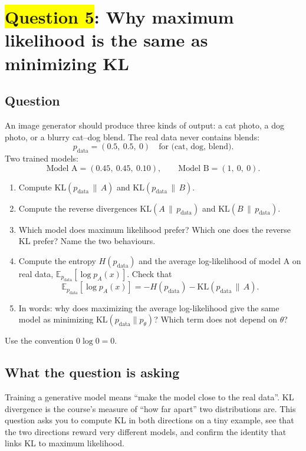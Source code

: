 \documentclass[12pt,a4paper]{article}
\begin{document}
\section{\texorpdfstring{\colorbox{yellow}{Question 5}}{Question 5}: Why maximum likelihood is the same as minimizing KL}

\subsection{Question}

An image generator should produce three kinds of output: a cat photo, a dog photo, or a blurry cat--dog blend. The real data never contains blends:
\[
p_{\text{data}}=(0.5,\ 0.5,\ 0)\quad\text{for (cat, dog, blend).}
\]
Two trained models:
\[
\text{Model A}=(0.45,\ 0.45,\ 0.10),\qquad \text{Model B}=(1,\ 0,\ 0).
\]
\begin{enumerate}[label=(\alph*)]
  \item Compute $\mathrm{KL}(p_{\text{data}}\,\|\,A)$ and $\mathrm{KL}(p_{\text{data}}\,\|\,B)$.
  \item[\colorbox{yellow}{(b)}] Compute the reverse divergences $\mathrm{KL}(A\,\|\,p_{\text{data}})$ and $\mathrm{KL}(B\,\|\,p_{\text{data}})$.
  \item[\colorbox{yellow}{(c)}] Which model does maximum likelihood prefer? Which one does the reverse KL prefer? Name the two behaviours.
  \item[\colorbox{yellow}{(d)}] Compute the entropy $H(p_{\text{data}})$ and the average log-likelihood of model A on real data, $\mathbb{E}_{p_{\text{data}}}[\log p_A(x)]$. Check that
  \[
  \mathbb{E}_{p_{\text{data}}}[\log p_A(x)]=-H(p_{\text{data}})-\mathrm{KL}(p_{\text{data}}\,\|\,A).
  \]
  \item In words: why does maximizing the average log-likelihood give the same model as minimizing $\mathrm{KL}(p_{\text{data}}\|p_\theta)$? Which term does not depend on $\theta$?
\end{enumerate}
Use the convention $0\log0=0$.

\subsection{What the question is asking}

Training a generative model means ``make the model close to the real data''. KL divergence is the course's measure of ``how far apart'' two distributions are. This question asks you to compute KL in both directions on a tiny example, see that the two directions reward very different models, and confirm the identity that links KL to maximum likelihood.
\end{document}
